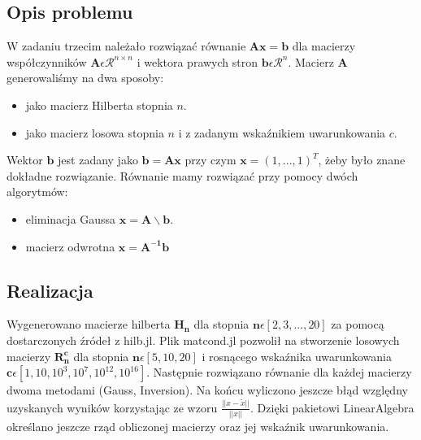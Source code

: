 \documentclass[]{article}
\begin{document}
\subsection{Opis problemu}
W zadaniu trzecim należało rozwiązać równanie $\mathbf{Ax = b}$ dla macierzy współczynników $\mathbf{A} \epsilon \mathcal{R}^{n \times n}$ i wektora prawych stron $\mathbf{b} \epsilon \mathcal{R}^{n}$. Macierz $\mathbf{A}$ generowaliśmy na dwa sposoby:
\begin{itemize}
	\item jako macierz Hilberta stopnia $n$.
	\item jako macierz losowa stopnia $n$ i z zadanym wskaźnikiem uwarunkowania $c$. 
\end{itemize}
Wektor $\mathbf{b}$ jest zadany jako $\mathbf{b = Ax}$ przy czym $\mathbf{x} = (1,...,1)^{T}$, żeby było znane dokładne rozwiązanie. Równanie mamy rozwiązać przy pomocy dwóch algorytmów:
\begin{itemize}
	\item eliminacja Gaussa $\mathbf{x = A \backslash b}$.
	\item macierz odwrotna $\mathbf{x = A^{-1} b}$
\end{itemize}
\subsection{Realizacja}
Wygenerowano macierze hilberta $\mathbf{H_n}$ dla stopnia $\mathbf{n} \epsilon [2, 3, ..., 20]$ za pomocą dostarczonych źródeł z hilb.jl. Plik matcond.jl pozwolił na stworzenie losowych macierzy $\mathbf{R^c_n}$ dla stopnia $\mathbf{n} \epsilon [5, 10, 20]$ i rosnącego wskaźnika uwarunkowania $\mathbf{c} \epsilon [1, 10, 10^3, 10^7, 10^{12}, 10^{16} ]$. Następnie rozwiązano równanie dla każdej macierzy dwoma metodami (Gauss, Inversion). Na końcu wyliczono jeszcze błąd względny uzyskanych wyników korzystając ze wzoru $ \frac{||x - \tilde{x} ||}{||x||}$. Dzięki pakietowi LinearAlgebra określano jeszcze rząd obliczonej macierzy oraz jej wskaźnik uwarunkowania. 
\newpage
\end{document}
